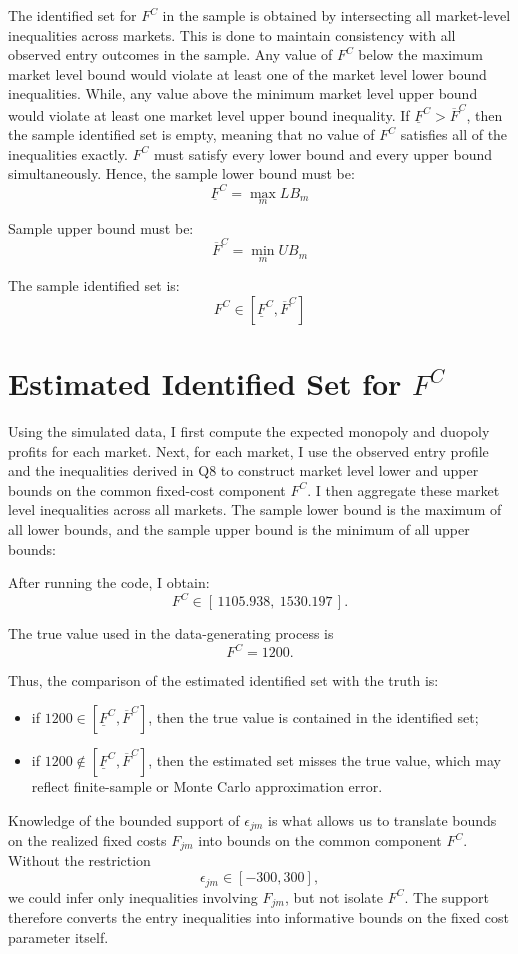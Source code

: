 \documentclass[12pt]{article}
\begin{document}
The identified set for \(F^C\) in the sample is obtained by intersecting all market-level inequalities across markets. This is done to maintain consistency with all observed entry outcomes in the sample. Any value of \(F^C\) below the maximum market level bound would violate at least one of the market level lower bound inequalities. While, any value above the minimum market level upper bound would violate at least one market level upper bound inequality. If \(\underline{F}^C > \overline{F}^C\), then the sample identified set is empty, meaning that no value of \(F^C\) satisfies all of the inequalities exactly. \(F^C\) must satisfy every lower bound and every upper bound simultaneously. Hence, the sample lower bound must be:
\[
\underline{F}^C = \max_m LB_m
\]

Sample upper bound must be:
\[
\overline{F}^C = \min_m UB_m
\]

The sample identified set is:
\[
\boxed{
F^C \in [\underline{F}^C,\overline{F}^C]
}
\]

\section*{Estimated Identified Set for \(F^C\)}

Using the simulated data, I first compute the expected monopoly and duopoly profits for each market. Next, for each market, I use the observed entry profile and the inequalities derived in Q8 to construct market level lower and upper bounds on the common fixed-cost component \(F^C\). I then aggregate these market level inequalities across all markets. The sample lower bound is the maximum of all lower bounds, and the sample upper bound is the minimum of all upper bounds:

After running the code, I obtain:
\[
\boxed{
F^C \in [\,1105.938,\ 1530.197\,].
}
\]

The true value used in the data-generating process is
\[
F^C = 1200.
\]

Thus, the comparison of the estimated identified set with the truth is:
\begin{itemize}
\item if \(1200 \in [\underline{F}^C,\overline{F}^C]\), then the true value is contained in the identified set;
\item if \(1200 \notin [\underline{F}^C,\overline{F}^C]\), then the estimated set misses the true value, which may reflect finite-sample or Monte Carlo approximation error.
\end{itemize}

Knowledge of the bounded support of \(\epsilon_{jm}\) is what allows us to translate bounds on the realized fixed costs \(F_{jm}\) into bounds on the common component \(F^C\). Without the restriction
\[
\epsilon_{jm} \in [-300,300],
\]
we could infer only inequalities involving \(F_{jm}\), but not isolate \(F^C\). The support therefore converts the entry inequalities into informative bounds on the fixed cost parameter itself.
\end{document}
